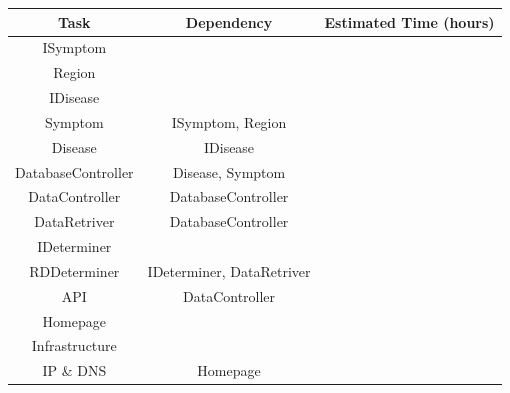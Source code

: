 \begin{center}
	\begin{tabular}[h]{|c|c|c|}
		\hline
		Task & Dependency & Estimated Time (hours) \\ \hline
		ISymptom & & \\ \hline
		Region & &  \\ \hline
		IDisease & &  \\ \hline
		Symptom & ISymptom, Region &  \\ \hline
		Disease & IDisease & \\ \hline
		DatabaseController & Disease, Symptom & \\ \hline
		DataController & DatabaseController &  \\ \hline
		DataRetriver & DatabaseController & \\ \hline
		IDeterminer & &  \\ \hline
		RDDeterminer & IDeterminer, DataRetriver & \\ \hline
		API & DataController & \\ \hline
		Homepage & & \\ \hline
		Infrastructure & & \\ \hline
		IP \& DNS & Homepage & \\ \hline
	\end{tabular}
\end{center}

